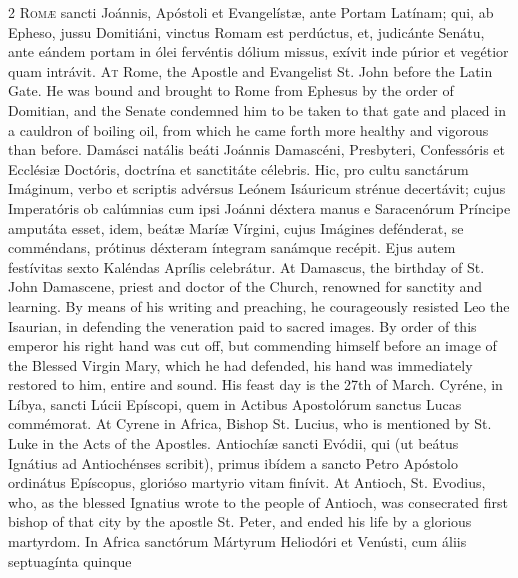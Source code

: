 \begin{paracol}{2}
\lettrine[lines=2]{R}{omæ} sancti Joánnis, 
 Apóstoli et Evangelístæ, ante Portam Latínam; qui, ab Epheso, jussu 
 Domitiáni, vinctus Romam est perdúctus, et, judicánte Senátu, ante eándem 
 portam in ólei fervéntis dólium missus, exívit inde púrior et vegétior quam 
 intrávit.
\switchcolumn
{}
\lettrine[lines=2]{A}{t} Rome, the Apostle and Evangelist 
 St. John before the Latin Gate. He was bound and brought to Rome from 
 Ephesus by the order of Domitian, and the Senate condemned him to be taken 
 to that gate and placed in a cauldron of boiling oil, from which he came 
 forth more healthy and vigorous than before.
\switchcolumn*
{}
Damásci natális beáti 
 Joánnis Damascéni, Presbyteri, Confessóris et Ecclésiæ Doctóris, doctrína et 
 sanctitáte célebris. Hic, pro cultu sanctárum Imáginum, verbo et 
 scriptis advérsus Leónem Isáuricum strénue decertávit; cujus Imperatóris ob 
 calúmnias cum ipsi Joánni déxtera manus e Saracenórum Príncipe amputáta 
 esset, idem, beátæ Maríæ Vírgini, cujus Imágines 
 defénderat, se comméndans, 
 prótinus déxteram íntegram sanámque recépit. Ejus autem festívitas 
 sexto Kaléndas Aprílis celebrátur.
\switchcolumn
{}
At Damascus, the birthday of St. 
 John Damascene, priest and doctor of the Church, renowned for sanctity and 
 learning. By means of his writing and preaching, he courageously 
 resisted Leo the Isaurian, in defending the veneration paid to sacred 
 images. By order of this emperor his right hand was cut off, but 
 commending himself before an image of the Blessed Virgin Mary, which he had 
 defended, his hand was immediately restored to him, entire and sound. 
 His feast day is the 27th of March.
\switchcolumn*
{}
Cyréne, in Líbya, sancti Lúcii Epíscopi, quem in Actibus Apostolórum sanctus Lucas commémorat.
\switchcolumn
{}
At Cyrene in Africa, Bishop St. 
 Lucius, who is mentioned by St. Luke in the Acts of the Apostles.
\switchcolumn*
{}
Antiochíæ sancti 
 Evódii, qui (ut beátus Ignátius ad Antiochénses scribit), primus ibídem a 
 sancto Petro Apóstolo ordinátus Epíscopus, glorióso martyrio vitam finívit.
\switchcolumn
{}
At Antioch, St. Evodius, who, as 
 the blessed Ignatius wrote to the people of Antioch, was consecrated first 
 bishop of that city by the apostle St. Peter, and ended his life by a 
 glorious martyrdom.
\switchcolumn*
{}
In Africa sanctórum 
 Mártyrum Heliodóri et Venústi, cum áliis septuagínta quinque

\end{paracol}
